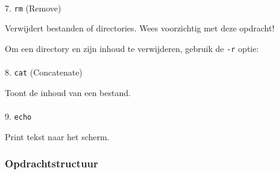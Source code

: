 \documentclass[
  letterpaper,
  DIV=11,
  numbers=noendperiod]{scrartcl}
\makeatletter
\let\oldparagraph\paragraph
\renewcommand{\paragraph}{
    \@ifstar
      \xxxParagraphStar
      \xxxParagraphNoStar
  }
\newcommand{\xxxParagraphStar}[1]{\oldparagraph*{#1}\mbox{}}
\newcommand{\xxxParagraphNoStar}[1]{\oldparagraph{#1}\mbox{}}
\newenvironment{Shaded}{\begin{snugshade}}{\end{snugshade}}
\newcommand{\AttributeTok}[1]{\textcolor[rgb]{0.40,0.45,0.13}{#1}}
\newcommand{\ExtensionTok}[1]{\textcolor[rgb]{0.00,0.23,0.31}{#1}}
\newcommand{\NormalTok}[1]{\textcolor[rgb]{0.00,0.23,0.31}{#1}}
\newcommand{\StringTok}[1]{\textcolor[rgb]{0.13,0.47,0.30}{#1}}
\makeatother
\begin{document}
\paragraph{\texorpdfstring{7. \texttt{rm}
(Remove)}{7. rm (Remove)}}\label{rm-remove}

Verwijdert bestanden of directories. Wees voorzichtig met deze opdracht!

\begin{Shaded}
\end{Shaded}

Om een directory en zijn inhoud te verwijderen, gebruik de \texttt{-r}
optie:

\begin{Shaded}
\end{Shaded}

\paragraph{\texorpdfstring{8. \texttt{cat}
(Concatenate)}{8. cat (Concatenate)}}\label{cat-concatenate}

Toont de inhoud van een bestand.

\begin{Shaded}
\end{Shaded}

\paragraph{\texorpdfstring{9. \texttt{echo}}{9. echo}}\label{echo}

Print tekst naar het scherm.

\begin{Shaded}
\end{Shaded}

\subsubsection{Opdrachtstructuur}\label{opdrachtstructuur}
\end{document}
